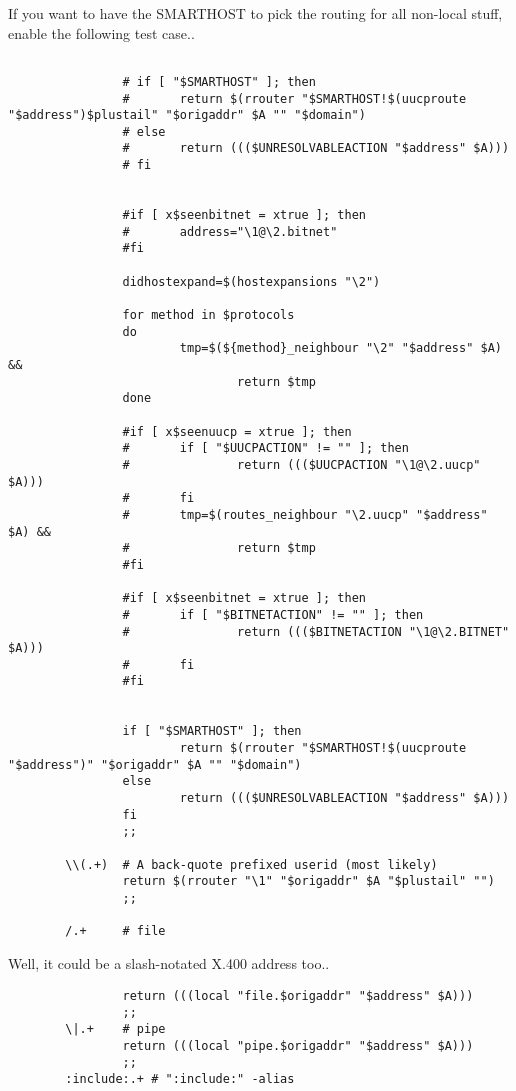 If you want to have the SMARTHOST to pick the routing
for all non-local stuff, enable the following test case..

\begin{verbatim}

                # if [ "$SMARTHOST" ]; then
                #       return $(rrouter "$SMARTHOST!$(uucproute "$address")$plustail" "$origaddr" $A "" "$domain")
                # else
                #       return ((($UNRESOLVABLEACTION "$address" $A)))
                # fi


                #if [ x$seenbitnet = xtrue ]; then
                #       address="\1@\2.bitnet"
                #fi

                didhostexpand=$(hostexpansions "\2")

                for method in $protocols
                do
                        tmp=$(${method}_neighbour "\2" "$address" $A) &&
                                return $tmp
                done

                #if [ x$seenuucp = xtrue ]; then
                #       if [ "$UUCPACTION" != "" ]; then
                #               return ((($UUCPACTION "\1@\2.uucp" $A)))
                #       fi
                #       tmp=$(routes_neighbour "\2.uucp" "$address" $A) &&
                #               return $tmp
                #fi

                #if [ x$seenbitnet = xtrue ]; then
                #       if [ "$BITNETACTION" != "" ]; then
                #               return ((($BITNETACTION "\1@\2.BITNET" $A)))
                #       fi
                #fi


                if [ "$SMARTHOST" ]; then
                        return $(rrouter "$SMARTHOST!$(uucproute "$address")" "$origaddr" $A "" "$domain")
                else
                        return ((($UNRESOLVABLEACTION "$address" $A)))
                fi
                ;;

        \\(.+)  # A back-quote prefixed userid (most likely)
                return $(rrouter "\1" "$origaddr" $A "$plustail" "")
                ;;

        /.+     # file
\end{verbatim}


Well, it could be a slash-notated X.400 address too..

\begin{verbatim}
                return (((local "file.$origaddr" "$address" $A)))
                ;;
        \|.+    # pipe
                return (((local "pipe.$origaddr" "$address" $A)))
                ;;
        :include:.+ # ":include:" -alias
\end{verbatim}


